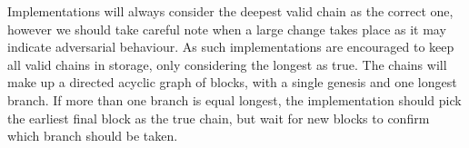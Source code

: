 Implementations will always consider the deepest valid chain as the correct one, however we should take careful note when a large change takes place as it may indicate adversarial behaviour. As such implementations are encouraged to keep all valid chains in storage, only considering the longest as true. The chains will make up a directed acyclic graph of blocks, with a single genesis and one longest branch. If more than one branch is equal longest, the implementation should pick the earliest final block as the true chain, but wait for new blocks to confirm which branch should be taken.